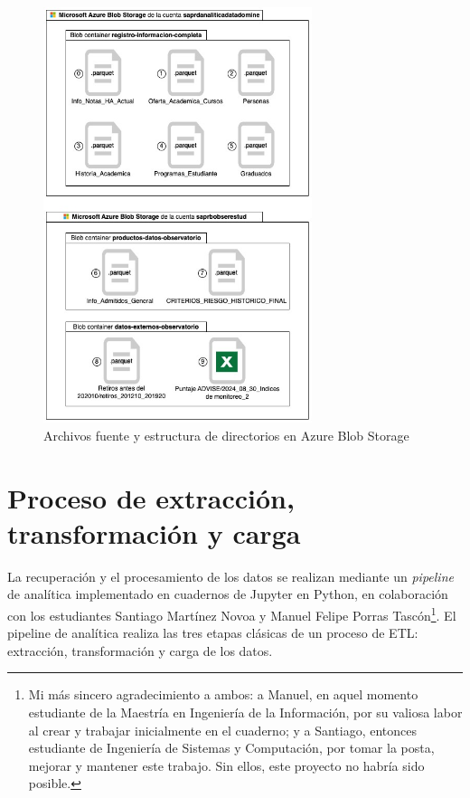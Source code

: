 \begin{figure}[h]
	\centering
	\includegraphics[width=0.7\textwidth]{img/blob_storage.jpg}
	\caption{Archivos fuente y estructura de directorios en Azure Blob Storage}
	\label{fig:blob_storage}
\end{figure}


\section{Proceso de extracción, transformación y carga}

La recuperación y el procesamiento de los datos se realizan mediante un \textit{pipeline} de analítica implementado en cuadernos de Jupyter en Python, en colaboración con los estudiantes Santiago Martínez Novoa y Manuel Felipe Porras Tascón\footnote{Mi más sincero agradecimiento a ambos: a Manuel, en aquel momento estudiante de la Maestría en Ingeniería de la Información, por su valiosa labor al crear y trabajar inicialmente en el cuaderno; y a Santiago, entonces estudiante de Ingeniería de Sistemas y Computación, por tomar la posta, mejorar y mantener este trabajo. Sin ellos, este proyecto no habría sido posible.}.
El pipeline de analítica realiza las tres etapas clásicas de un proceso de \gls{ETL}: extracción, transformación y carga de los datos.


